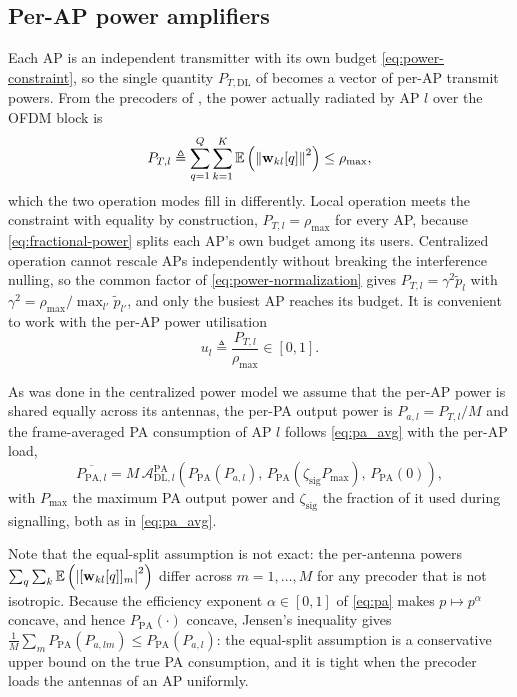\subsection{Per-AP power amplifiers}
\label{ssec:dmimo_pa}

Each AP is an independent transmitter with its own budget
\eqref{eq:power-constraint}, so the single quantity $P_{T,\mathrm{DL}}$ of
 becomes a vector of per-AP transmit powers. From the precoders of
, the power actually radiated by AP $l$ over the OFDM block is
\begin{equation}
\label{eq:ptl}
P_{T,l} \triangleq \sum_{q=1}^{Q}\sum_{k=1}^{K}
\mathbb{E}\left(\left\lVert\boldsymbol{\mathrm{w}}_{kl}[q]\right\rVert^{2}\right) \leq \rho_{\max},
\end{equation}
which the two operation modes fill in differently. Local operation meets the
constraint with equality by construction, $P_{T,l}=\rho_{\max}$ for every AP,
because \eqref{eq:fractional-power} splits each AP's own budget among its users.
Centralized operation cannot rescale APs independently without breaking the
interference nulling, so the common factor of \eqref{eq:power-normalization}
gives $P_{T,l}=\gamma^{2}\tilde p_{l}$ with $\gamma^{2}=\rho_{\max}/\max_{l'}\tilde
p_{l'}$, and only the busiest AP reaches its budget. It is convenient to work
with the per-AP power utilisation
\begin{equation}
\label{eq:util}
u_{l} \triangleq \frac{P_{T,l}}{\rho_{\max}} \in [0,1].
\end{equation}

As was done in the centralized power model we assume that the per-AP power is shared equally across its antennas, the per-PA
output power is $P_{a,l}=P_{T,l}/M$ and the frame-averaged PA consumption of AP
$l$ follows \eqref{eq:pa_avg} with the per-AP load,
\begin{equation}
\label{eq:pa_avg_ap}
\overline{P_{\mathrm{PA},l}} = M\,
\mathcal{A}_{\mathrm{DL},l}^{\mathrm{PA}}\!\left(
P_{\mathrm{PA}}(P_{a,l}),\,
P_{\mathrm{PA}}(\zeta_{\mathrm{sig}}P_{\max}),\,
P_{\mathrm{PA}}(0)\right),
\end{equation}
with $P_{\max}$ the maximum PA output power and $\zeta_{\mathrm{sig}}$ the
fraction of it used during signalling, both as in \eqref{eq:pa_avg}.

Note that the equal-split assumption is not exact: the per-antenna powers
$\sum_{q}\sum_{k}\mathbb{E}\left(\left\lvert[\boldsymbol{\mathrm{w}}_{kl}[q]]_{m}\right\rvert^{2}\right)$ differ across
$m=1,\dots,M$ for any precoder that is not isotropic. Because the efficiency
exponent $\alpha\in[0,1]$ of \eqref{eq:pa} makes $p\mapsto p^{\alpha}$ concave,
and hence $P_{\mathrm{PA}}(\cdot)$ concave, Jensen's inequality gives
$\frac{1}{M}\sum_{m}P_{\mathrm{PA}}(P_{a,lm}) \leq P_{\mathrm{PA}}(P_{a,l})$: the
equal-split assumption is a conservative upper bound on the true PA consumption,
and it is tight when the precoder loads the antennas of an AP uniformly.

